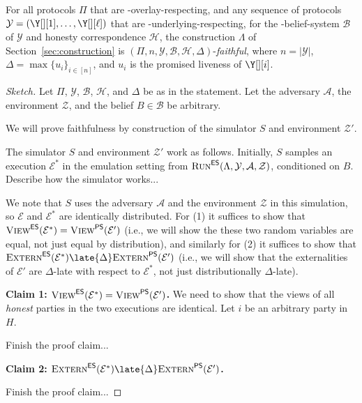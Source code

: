 \begin{conjecture}\label{conj:simulation}
  For all protocols $\Pi$ that are \rollerblade-overlay-respecting,
  and any sequence of protocols $\mathcal{Y} = (\Y[][1], \ldots, \Y[][\ell])$
  that are \rollerblade-underlying-respecting,
  for the \rollerblade-belief-system $\mathcal{B}$ of $\mathcal{Y}$
  and honesty correspondence $\mathcal{H}$,
  the \rollerblade construction $\Lambda$ of Section~\ref{sec:construction} is
  $(\Pi, n, \mathcal{Y}, \mathcal{B}, \mathcal{H}, \Delta)$-\emph{faithful},
  where $n = |\mathcal{Y}|$, $\Delta = \max\{u_i\}_{i \in [n]}$,
  and $u_i$ is the promised liveness of $\Y[][i]$.
\end{conjecture}
\begin{proof}[Sketch]
  Let $\Pi$, $\mathcal{Y}$, $\mathcal{B}$, $\mathcal{H}$,
  and $\Delta$ be as in the statement.
  Let the adversary $\mathcal{A}$, the environment $\mathcal{Z}$,
  and the belief $B \in \mathcal{B}$ be arbitrary.

  We will prove faithfulness by
  construction of the simulator $S$ and environment $\mathcal{Z}'$.

  The simulator $S$ and environment $\mathcal{Z}'$ work as follows.
  Initially, $S$ samples an execution
  $\mathcal{E}^*$ in the emulation setting from
  $\textsc{Run}^{\textsf{ES}}(\Lambda, \mathcal{Y}, \mathcal{A}, \mathcal{Z})$,
  conditioned on $B$.
  {\color{red} Describe how the simulator works...}

  We note that $S$ uses the adversary $\mathcal{A}$ and the
  environment $\mathcal{Z}$ in this simulation, so $\mathcal{E}$
  and $\mathcal{E}^*$ are identically distributed.
  For (1) it suffices to show that
  $\textsc{View}^{\textsf{ES}}(\mathcal{E}^*) = \textsc{View}^{\textsf{PS}}(\mathcal{E}')$
  (i.e., we will show the these two random variables are equal,
  not just equal by distribution),
  and similarly for (2) it suffices to show that
  $\LCExtern(\mathcal{E}^*) \late{\Delta} \PEExtern(\mathcal{E}')$
  (i.e., we will show that the externalities of $\mathcal{E}'$ are $\Delta$-late
  with respect to $\mathcal{E}^*$, not just distributionally $\Delta$-late).

  \noindent
  \textbf{Claim 1: $\textsc{View}^{\textsf{ES}}(\mathcal{E}^*) = \textsc{View}^{\textsf{PS}}(\mathcal{E}')$.} We need to show
  that the views of all \emph{honest} parties in the two executions are identical. Let
  $i$ be an arbitrary party in $H$.

  {\color{red} Finish the proof claim...}

  \noindent
  \textbf{Claim 2: $\LCExtern(\mathcal{E}^*) \late{\Delta} \PEExtern(\mathcal{E}')$.}

  {\color{red} Finish the proof claim...}
\end{proof}

